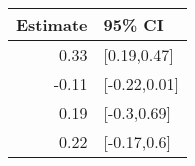 \begin{tabular}{rl}
  \hline
Estimate & 95\% CI \\ 
  \hline
0.33 & [0.19,0.47] \\ 
  -0.11 & [-0.22,0.01] \\ 
  0.19 & [-0.3,0.69] \\ 
  0.22 & [-0.17,0.6] \\ 
   \hline
\end{tabular}

